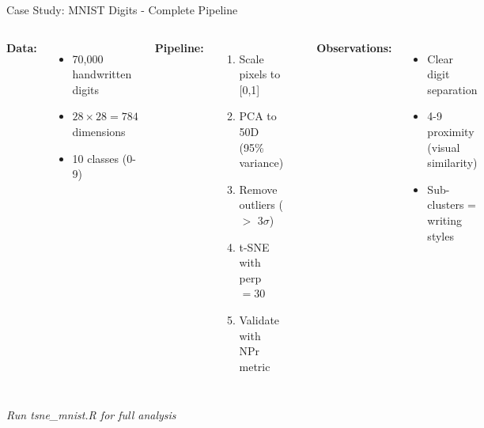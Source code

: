 \documentclass[aspectratio=169]{beamer}
\begin{document}
      \begin{frame}{Case Study: MNIST Digits - Complete Pipeline}
      \begin{columns}
      \textbf{Data:}
      \begin{itemize}
      \item 70,000 handwritten digits
      \item $28×28 = 784$ dimensions
      \item 10 classes (0-9)
      \end{itemize}
      
      \textbf{Pipeline:}
      \begin{enumerate}
      \item Scale pixels to [0,1]
      \item PCA to 50D (95\% variance)
      \item Remove outliers ($>$ 3$\sigma$)
      \item t-SNE with perp $=30$
      \item Validate with NPr metric
      \end{enumerate}
      
      \includegraphics[width=0.8\textwidth]{./Figures/mnist_tsne_result.png}
      
      \textbf{Observations:}
      \begin{itemize}
      \item Clear digit separation
      \item 4-9 proximity (visual similarity)
      \item Sub-clusters = writing styles
      \end{itemize}
      \end{columns}
      
      \textit{Run tsne\_mnist.R for full analysis}
      \end{frame}
\end{document}
